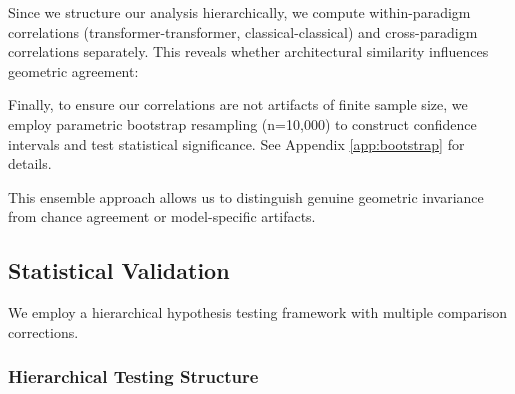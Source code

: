 \documentclass[11pt,letterpaper]{article}
\begin{document}
Since we structure our analysis hierarchically, we compute within-paradigm correlations (transformer-transformer, classical-classical) and cross-paradigm correlations separately. This reveals whether architectural similarity influences geometric agreement:


Finally, to ensure our correlations are not artifacts of finite sample size, we employ parametric bootstrap resampling (n=10,000) to construct confidence intervals and test statistical significance. See Appendix \ref{app:bootstrap} for details.

This ensemble approach allows us to distinguish genuine geometric invariance from chance agreement or model-specific artifacts.

\subsection{Statistical Validation}

We employ a hierarchical hypothesis testing framework with multiple comparison corrections.

\subsubsection{Hierarchical Testing Structure}
\end{document}
